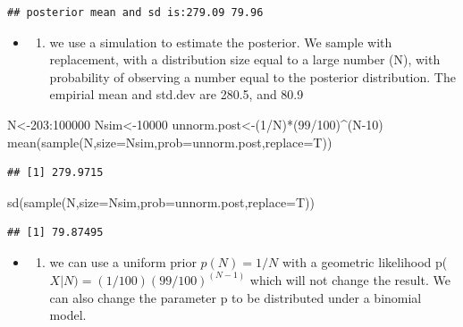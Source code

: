 \documentclass[
]{book}
\newenvironment{Shaded}{\begin{snugshade}}{\end{snugshade}}
\newcommand{\AttributeTok}[1]{\textcolor[rgb]{0.77,0.63,0.00}{#1}}
\newcommand{\DecValTok}[1]{\textcolor[rgb]{0.00,0.00,0.81}{#1}}
\newcommand{\FunctionTok}[1]{\textcolor[rgb]{0.00,0.00,0.00}{#1}}
\newcommand{\NormalTok}[1]{#1}
\newcommand{\OtherTok}[1]{\textcolor[rgb]{0.56,0.35,0.01}{#1}}
\newcommand{\SpecialCharTok}[1]{\textcolor[rgb]{0.00,0.00,0.00}{#1}}
\providecommand{\tightlist}{%
  \setlength{\itemsep}{0pt}\setlength{\parskip}{0pt}}
\theoremstyle{definition}
\theoremstyle{definition}
\theoremstyle{definition}
\theoremstyle{definition}
\theoremstyle{remark}
\begin{document}
\begin{verbatim}
## posterior mean and sd is:279.09 79.96
\end{verbatim}

\begin{itemize}
\item
  \begin{enumerate}
  \def\labelenumi{(\alph{enumi})}
  \setcounter{enumi}{1}
  \tightlist
  \item
    we use a simulation to estimate the posterior. We sample with replacement, with a distribution size equal to a large number (N), with probability of observing a number equal to the posterior distribution. The empirial mean and std.dev are 280.5, and 80.9
  \end{enumerate}
\end{itemize}

\begin{Shaded}
\begin{Highlighting}[]
\NormalTok{ N}\OtherTok{\textless{}{-}}\DecValTok{203}\SpecialCharTok{:}\DecValTok{100000}
\NormalTok{ Nsim}\OtherTok{\textless{}{-}}\DecValTok{10000}
\NormalTok{ unnorm.post}\OtherTok{\textless{}{-}}\NormalTok{(}\DecValTok{1}\SpecialCharTok{/}\NormalTok{N)}\SpecialCharTok{*}\NormalTok{(}\DecValTok{99}\SpecialCharTok{/}\DecValTok{100}\NormalTok{)}\SpecialCharTok{\^{}}\NormalTok{(N}\DecValTok{{-}10}\NormalTok{)}
 \FunctionTok{mean}\NormalTok{(}\FunctionTok{sample}\NormalTok{(N,}\AttributeTok{size=}\NormalTok{Nsim,}\AttributeTok{prob=}\NormalTok{unnorm.post,}\AttributeTok{replace=}\NormalTok{T))}
\end{Highlighting}
\end{Shaded}

\begin{verbatim}
## [1] 279.9715
\end{verbatim}

\begin{Shaded}
\begin{Highlighting}[]
 \FunctionTok{sd}\NormalTok{(}\FunctionTok{sample}\NormalTok{(N,}\AttributeTok{size=}\NormalTok{Nsim,}\AttributeTok{prob=}\NormalTok{unnorm.post,}\AttributeTok{replace=}\NormalTok{T))}
\end{Highlighting}
\end{Shaded}

\begin{verbatim}
## [1] 79.87495
\end{verbatim}

\begin{itemize}
\item
  \begin{enumerate}
  \def\labelenumi{(\alph{enumi})}
  \setcounter{enumi}{2}
  \tightlist
  \item
    we can use a uniform prior \(p(N) = 1/N\) with a geometric likelihood p(\(X|N)=(1/100)(99/100)^(N-1)\) which will not change the result. We can also change the parameter p to be distributed under a binomial model.
  \end{enumerate}
\end{itemize}
\end{document}
